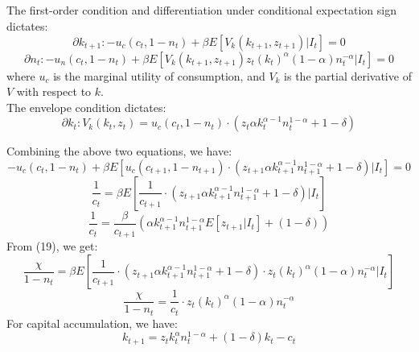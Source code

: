 \documentclass{article}
\begin{document}

\subsection{}

The first-order condition and differentiation under conditional expectation sign dictates:
\begin{equation}
    \partial{k_{t+1}}:  -u_c\left(c_t, 1 - n_t\right) + \beta E[V_k(k_{t+1}, z_{t+1}) | I_t] = 0
\end{equation}
\begin{equation}
    \partial{n_t}: -u_n\left(c_t, 1 - n_t\right) + \beta E[V_k(k_{t+1}, z_{t+1}) z_t (k_t)^{\alpha}(1-\alpha)n_t^{-\alpha}| I_t] = 0
\end{equation}
where $u_c$ is the marginal utility of consumption, and $V_k$ is the partial derivative of $V$ with respect to $k$. \\

The envelope condition dictates:
\begin{equation}
    \partial{k_t}: V_k(k_t, z_t) = u_c\left(c_t, 1 - n_t\right) \cdot \left(z_t \alpha k_t^{\alpha - 1} n_t^{1-\alpha} + 1 - \delta\right)
\end{equation}

Combining the above two equations, we have:
\begin{equation}
    -u_c\left(c_t, 1 - n_t\right) + \beta E[u_c\left(c_{t+1}, 1 - n_{t+1}\right) \cdot \left(z_{t+1} \alpha k_{t+1}^{\alpha - 1} n_{t+1}^{1-\alpha} + 1 - \delta\right) | I_t] = 0
\end{equation}
\begin{equation}
    \frac{1}{c_t} = \beta E\left[\frac{1}{c_{t+1}} \cdot \left(z_{t+1} \alpha k_{t+1}^{\alpha - 1} n_{t+1}^{1-\alpha} + 1 - \delta\right) | I_t\right]
\end{equation}
\begin{equation}
    \frac{1}{c_t} =  \frac{\beta}{c_{t+1}} \left( \alpha k_{t+1}^{\alpha - 1} n_{t+1}^{1-\alpha} E\left[z_{t+1} | I_t\right] + \left(1 - \delta\right) \right)
\end{equation}
From (19), we get:
\begin{equation}
    \frac{\chi}{1-n_t} = \beta E\left[\frac{1}{c_{t+1}} \cdot \left(z_{t+1} \alpha k_{t+1}^{\alpha - 1} n_{t+1}^{1-\alpha} + 1 - \delta\right)  \cdot z_t (k_t)^{\alpha}(1-\alpha)n_t^{-\alpha} | I_t\right]
\end{equation}
\begin{equation}
    \frac{\chi}{1-n_t} = \frac{1}{c_t} \cdot z_t (k_t)^{\alpha}(1-\alpha)n_t^{-\alpha}
\end{equation}
For capital accumulation, we have:
\begin{equation}
    k_{t+1} = z_t k_t^\alpha n_t^{1-\alpha} + (1-\delta) k_t - c_t
\end{equation}
\end{document}
